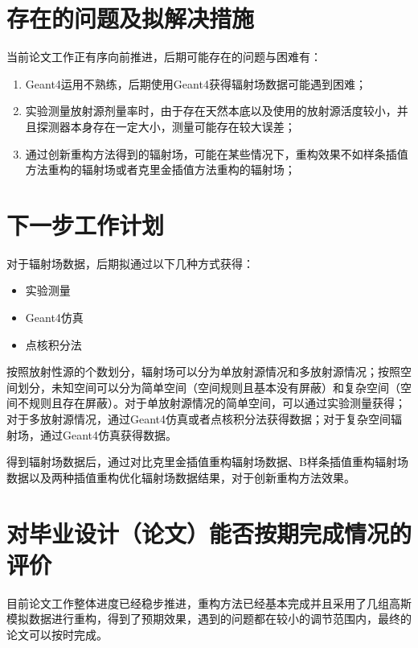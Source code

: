 \documentclass{article}
\begin{document}
\section{存在的问题及拟解决措施}
\songti {}
当前论文工作正有序向前推进，后期可能存在的问题与困难有：
\begin{enumerate}
    \item Geant4运用不熟练，后期使用Geant4获得辐射场数据可能遇到困难；
    \item 实验测量放射源剂量率时，由于存在天然本底以及使用的放射源活度较小，并且探测器本身存在一定大小，测量可能存在较大误差；
    \item 通过创新重构方法得到的辐射场，可能在某些情况下，重构效果不如样条插值方法重构的辐射场或者克里金插值方法重构的辐射场；
\end{enumerate}

\section{下一步工作计划}
\songti {}
对于辐射场数据，后期拟通过以下几种方式获得：
\begin{itemize}
    \item 实验测量
    \item Geant4仿真
    \item 点核积分法
\end{itemize}

按照放射性源的个数划分，辐射场可以分为单放射源情况和多放射源情况；按照空间划分，未知空间可以分为简单空间（空间规则且基本没有屏蔽）和复杂空间（空间不规则且存在屏蔽）。对于单放射源情况的简单空间，可以通过实验测量获得；对于多放射源情况，通过Geant4仿真或者点核积分法获得数据；对于复杂空间辐射场，通过Geant4仿真获得数据。

得到辐射场数据后，通过对比克里金插值重构辐射场数据、B样条插值重构辐射场数据以及两种插值重构优化辐射场数据结果，对于创新重构方法效果。

\section{对毕业设计（论文）能否按期完成情况的评价}
\songti {}
目前论文工作整体进度已经稳步推进，重构方法已经基本完成并且采用了几组高斯模拟数据进行重构，得到了预期效果，遇到的问题都在较小的调节范围内，最终的论文可以按时完成。
\end{document}
